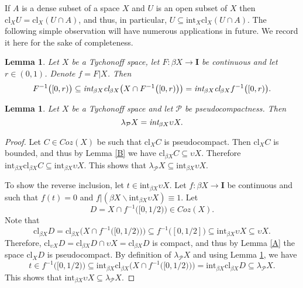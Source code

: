 \documentclass{amsart}
\newtheorem{lemma}[theorem]{Lemma}
\theoremstyle{definition}
\theoremstyle{remark}
\theoremstyle{notation}
\numberwithin{equation}{section}
\begin{document}
If $A$ is a dense subset of a space $X$ and $U$ is an open subset of $X$ then $\mbox{cl}_XU=\mbox{cl}_X(U\cap A)$, and thus, in particular, $U\subseteq\mbox{int}_X\mbox{cl}_X(U\cap A)$. The following simple observation will have numerous applications in future. We record it here for the sake of completeness.

\begin{lemma}\label{HYFU}
Let $X$ be a Tychonoff space, let $F:\beta X\rightarrow\mathbf{I}$ be continuous and let $r\in (0,1)$. Denote $f=F|X$. Then
\[F^{-1}\big([0,r)\big)\subseteq \mbox{\em int}_{\beta X}\mbox{\em cl}_{\beta X}\big(X\cap F^{-1}\big([0,r)\big)\big)=\mbox{\em int}_{\beta X}\mbox{\em cl}_{\beta X}f^{-1}\big([0,r)\big).\]
\end{lemma}

\begin{lemma}\label{JIUH}
Let $X$ be a Tychonoff  space and let ${\mathcal P}$ be pseudocompactness. Then
\[\lambda_{{\mathcal P}} X=\mbox{\em int}_{\beta X}\upsilon X.\]
\end{lemma}

\begin{proof}
Let $C\in Coz(X)$ be such that $\mbox{cl}_X C$ is pseudocompact. Then $\mbox{cl}_X C$ is bounded, and thus by Lemma \ref{B} we have
$\mbox{cl}_{\beta X} C\subseteq\upsilon X$. Therefore  $\mbox{int}_{\beta X}\mbox{cl}_{\beta X} C\subseteq\mbox{int}_{\beta X}\upsilon X$. This shows that $\lambda_{{\mathcal P}} X\subseteq\mbox{int}_{\beta X}\upsilon X$.

To show the reverse inclusion, let $t\in \mbox{int}_{\beta X}\upsilon X$. Let $f:\beta X\rightarrow\mathbf{I}$ be  continuous and such that $f(t)=0$
and $f|(\beta X\backslash \mbox{int}_{\beta X}\upsilon X)\equiv 1$. Let
\[D=X\cap f^{-1}\big([0,1/2)\big)\in Coz(X).\]
Note that
\[\mbox{cl}_{\beta X} D=\mbox{cl}_{\beta X} \big(X\cap f^{-1}\big([0,1/2)\big)\big)\subseteq f^{-1}\big([0,1/2]\big)\subseteq\mbox{int}_{\beta X}\upsilon X\subseteq\upsilon X.\]
Therefore, $\mbox{cl}_{\upsilon X} D=\mbox{cl}_{\beta X} D\cap\upsilon X=\mbox{cl}_{\beta X} D$ is compact, and thus by Lemma \ref{A} the space   $\mbox{cl}_X D$ is pseudocompact. By definition of
$\lambda_{{\mathcal P}} X$ and using Lemma \ref{HYFU}, we have
\[t\in f^{-1}\big([0,1/2)\big)\subseteq\mbox{int}_{\beta X}\mbox{cl}_{\beta X}\big(X\cap f^{-1}\big([0,1/2)\big)\big)=\mbox{int}_{\beta X}\mbox{cl}_{\beta X} D\subseteq\lambda_{{\mathcal P}} X.\]
This shows that $\mbox{int}_{\beta X}\upsilon X\subseteq\lambda_{{\mathcal P}} X$.
\end{proof}
\end{document}
